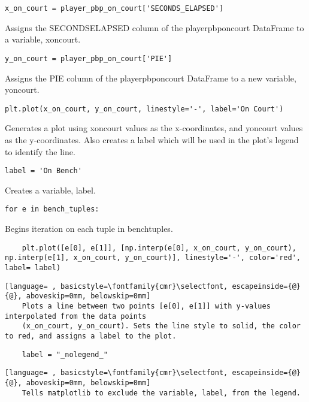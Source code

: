 \documentclass{article}
\begin{document}
\begin{lstlisting}
x_on_court = player_pbp_on_court['SECONDS_ELAPSED']
\end{lstlisting}
Assigns the SECONDS\textunderscore ELAPSED column of the player\textunderscore pbp\textunderscore on\textunderscore court DataFrame to a variable, x\textunderscore on\textunderscore court.
\begin{lstlisting}
y_on_court = player_pbp_on_court['PIE']
\end{lstlisting}
Assigns the PIE column of the player\textunderscore pbp\textunderscore on\textunderscore court DataFrame to a new variable, y\textunderscore on\textunderscore court.
\begin{lstlisting}
plt.plot(x_on_court, y_on_court, linestyle='-', label='On Court')
\end{lstlisting}
Generates a plot using x\textunderscore on\textunderscore court values as the x-coordinates, and y\textunderscore on\textunderscore court values as the y-coordinates. Also creates a label which will be used in the plot's legend to identify the line.
\begin{lstlisting}
label = 'On Bench'
\end{lstlisting}
Creates a variable, label.
\begin{lstlisting}
for e in bench_tuples:
\end{lstlisting}
Begins iteration on each tuple in bench\textunderscore tuples.
\begin{lstlisting}
    plt.plot([e[0], e[1]], [np.interp(e[0], x_on_court, y_on_court), np.interp(e[1], x_on_court, y_on_court)], linestyle='-', color='red', label= label)
\end{lstlisting}
\begin{lstlisting}[language= , basicstyle=\fontfamily{cmr}\selectfont, escapeinside={@}{@}, aboveskip=0mm, belowskip=0mm]
    Plots a line between two points [e[0], e[1]] with y-values interpolated from the data points
    (x_on_court, y_on_court). Sets the line style to solid, the color to red, and assigns a label to the plot.
\end{lstlisting}
\begin{lstlisting}
    label = "_nolegend_"
\end{lstlisting}
\begin{lstlisting}[language= , basicstyle=\fontfamily{cmr}\selectfont, escapeinside={@}{@}, aboveskip=0mm, belowskip=0mm]
    Tells matplotlib to exclude the variable, label, from the legend.
\end{lstlisting}
\end{document}
